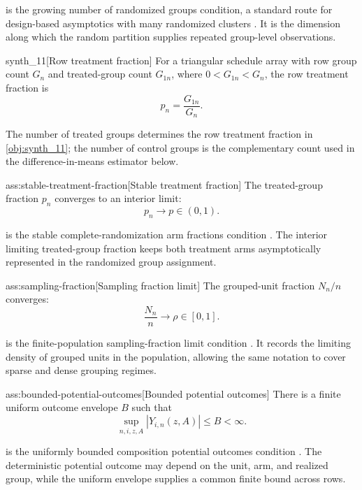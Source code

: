 \documentclass[11pt]{article}
\begin{document}
 is the growing number of randomized groups condition, a standard route for design-based asymptotics with many randomized clusters \citep{FuSamiiWang2026}. It is the dimension along which the random partition supplies repeated group-level observations.

\begin{definitionv}{synth_11}[Row treatment fraction]
For a triangular schedule array with row group count \(G_n\) and treated-group count \(G_{1n}\), where \(0<G_{1n}<G_n\), the row treatment fraction is
\[
p_n=\frac{G_{1n}}{G_n}.
\]
\end{definitionv}

The number of treated groups  determines the row treatment fraction in \cref{obj:synth_11}; the number of control groups  is the complementary count used in the difference-in-means estimator below.

\begin{assumptionv}{ass:stable-treatment-fraction}[Stable treatment fraction]
The treated-group fraction \(p_n\) converges to an interior limit:
\[
p_n \to p \in (0,1).
\]
\end{assumptionv}

 is the stable complete-randomization arm fractions condition \citep{LiDing2017}. The interior limiting treated-group fraction  keeps both treatment arms asymptotically represented in the randomized group assignment.

\begin{assumptionv}{ass:sampling-fraction}[Sampling fraction limit]
The grouped-unit fraction \(N_n/n\) converges:
\[
\frac{N_n}{n} \to \rho \in [0,1].
\]
\end{assumptionv}

 is the finite-population sampling-fraction limit condition \citep{Ohlsson1989}. It records the limiting density of grouped units in the population, allowing the same notation to cover sparse and dense grouping regimes.

\begin{assumptionv}{ass:bounded-potential-outcomes}[Bounded potential outcomes]
There is a finite uniform outcome envelope \(B\) such that
\[
\sup_{n,i,z,A}\left|Y_{i,n}(z,A)\right| \le B < \infty .
\]
\end{assumptionv}

 is the uniformly bounded composition potential outcomes condition \citep{FuSamiiWang2026}. The deterministic potential outcome  may depend on the unit, arm, and realized group, while the uniform envelope  supplies a common finite bound across rows.
\end{document}

